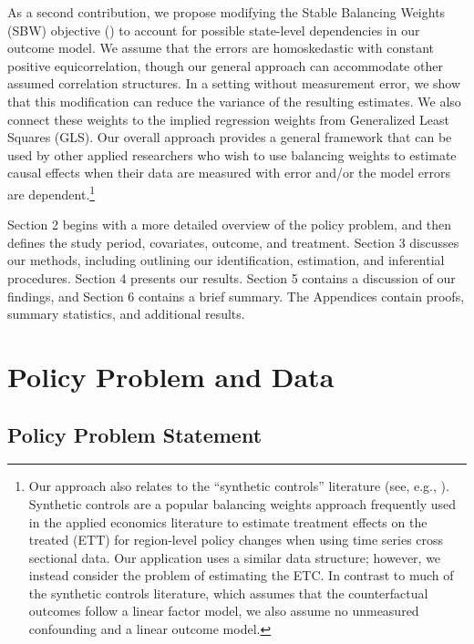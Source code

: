 \documentclass[aoas]{imsart}
\theoremstyle{plain}
\theoremstyle{remark}
\begin{document}
As a second contribution, we propose modifying the Stable Balancing Weights (SBW) objective (\cite{zubizarreta2015stable}) to account for possible state-level dependencies in our outcome model. We assume that the errors are homoskedastic with constant positive equicorrelation, though our general approach can accommodate other assumed correlation structures. In a setting without measurement error, we show that this modification can reduce the variance of the resulting estimates. We also connect these weights to the implied regression weights from Generalized Least Squares (GLS). Our overall approach provides a general framework that can be used by other applied researchers who wish to use balancing weights to estimate causal effects when their data are measured with error and/or the model errors are dependent.\footnote{Our approach also relates to the ``synthetic controls'' literature (see, e.g., \cite{abadie2010synthetic}). Synthetic controls are a popular balancing weights approach frequently used in the applied economics literature to estimate treatment effects on the treated (ETT) for region-level policy changes when using time series cross sectional data. Our application uses a similar data structure; however, we instead consider the problem of estimating the ETC. In contrast to much of the synthetic controls literature, which assumes that the counterfactual outcomes follow a linear factor model, we also assume no unmeasured confounding and a linear outcome model.}

Section 2 begins with a more detailed overview of the policy problem, and then defines the study period, covariates, outcome, and treatment. Section 3 discusses our methods, including outlining our identification, estimation, and inferential procedures. Section 4 presents our results. Section 5 contains a discussion of our findings, and Section 6 contains a brief summary. The Appendices contain proofs, summary statistics, and additional results.

\section{Policy Problem and Data}

\subsection{Policy Problem Statement}
\end{document}
